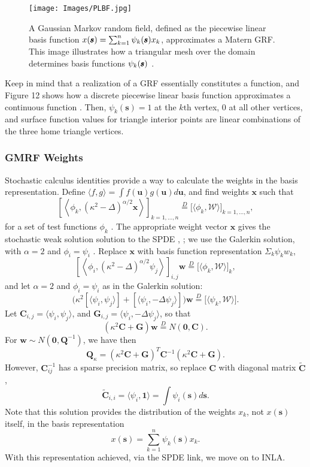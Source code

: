   \begin{figure}[H]
	\centering 
	\texttt{[image: Images/PLBF.jpg]}
	\caption{A Gaussian Markov random field, defined as the piecewise linear basis function $  x(\pmb{s}) = \sum_{k=1}^{n} \protect\psi_{k}(\pmb{s})x_{k}$, approximates a Matern GRF. This image illustrates how a triangular mesh over the domain determines basis functions $\protect\psi_{k}(\pmb{s})$ 
	\citep{Simpson2012}.}
	\end{figure}
	
Keep in mind that a realization of a GRF essentially constitutes a function, and Figure 12 shows how a discrete piecewise linear basis function approximates a continuous function \citep{Simpson2012}. Then, $\psi_{k}(\pmb{s}) = 1$ at the $k\text{th}$ vertex, $0$ at all other vertices, and surface function values for triangle interior points are linear combinations of the three home triangle vertices.

\subsubsection{GMRF Weights}

Stochastic calculus identities provide a way to calculate the weights in the basis representation. Define $\langle f, g \rangle = \int f(\pmb{u}) g(\pmb{u}) d\pmb{u}$, and find weights $\pmb{x}$ such that
$$ \left[ \left< \phi_{k}, (\kappa^{2} - \Delta)^{\alpha/2} \pmb{x} \right> \right]_{k = 1, \hdots, n} \overset{D}{=} \Big[ \langle \phi_{k}, \mathcal{W} \rangle \Big]_{k = 1, \hdots, n},$$
for a set of test functions $\phi_{k}$ \citep{Lindgren2011}. The appropriate weight vector $\pmb{x}$ gives the stochastic weak solution solution to the SPDE \citep{Mao2007}, \cite{Lindstrom2014}; we use the Galerkin solution, with $\alpha = 2$ and $\phi_{i} = \psi_{i}$ \citep{Lindgren2011}. Replace $\pmb{x}$ with basis function representation $\Sigma_{k}\psi_{k}w_{k}$,
$$ \left[ \left< \phi_{i}, (\kappa^{2} - \Delta)^{\alpha/2} \psi_{j} \right> \right]_{i,j}\pmb{w} \overset{D}{=} \Big[ \langle \phi_{k}, \mathcal{W} \rangle \Big]_{k}, $$
and let $\alpha = 2$ and $\phi_{i} = \psi_{i}$ as in the Galerkin solution:
$$ \Big(
\kappa^{2} [ \langle \psi_{i}, \psi_{j} \rangle ] + [ \langle \psi_{i}, -\Delta \psi_{j} \rangle ]
\Big) \pmb{w} \overset{D}{=} \Big[ \langle \psi_{k}, \mathcal{W} \rangle \Big]. $$
Let $\pmb{C}_{i,j} = \langle \psi_{i}, \psi_{j} \rangle$, and $ \pmb{G}_{i,j} = \langle \psi_{i}, - \Delta \psi_{j} \rangle$, so that
$$ \left(
\kappa^{2} \pmb{C} + \pmb{G} \right) \pmb{w} \overset{D}{=} N(\pmb{0},\pmb{C}).$$
For $\pmb{w} \sim N(\pmb{0}, \pmb{Q}^{-1})$, we have then
$$\pmb{Q}_{\kappa} = \left( \kappa^{2} \pmb{C} + \pmb{G} \right)^{T} \pmb{C}^{-1} \left( \kappa^{2} \pmb{C} + \pmb{G} \right).$$ 
However, $\pmb{C}_{ij}^{-1}$ has a sparse precision matrix, so replace $\pmb{C}$ with diagonal matrix $\widetilde{\pmb{C}}$,
$$ \widetilde{\pmb{C}}_{i,i} = \langle \psi_{i}, \pmb{1} \rangle = \int \psi_{i}(\pmb{s}) d\pmb{s}.$$ 
Note that this solution provides the distribution of the weights $x_{k}$, not $x(\pmb{s})$ itself, in the basis representation
$$ x(\pmb{s}) = \sum_{k=1}^{n} \psi_{k}(\pmb{s})x_{k}.$$
With this representation achieved, via the SPDE link, we move on to INLA.

